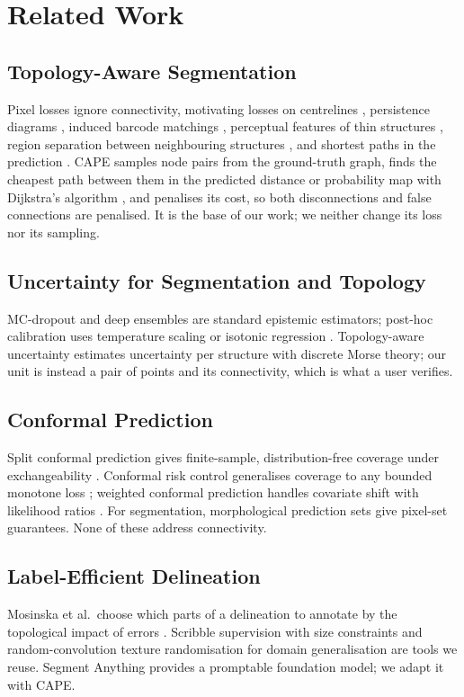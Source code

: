 \documentclass[10pt,letterpaper,journal]{IEEEtran}
\newcommand{\1}{\mathbf{1}}
\begin{document}
\section{Related Work}\label{sec:related}
\subsection{Topology-Aware Segmentation}
Pixel losses ignore connectivity, motivating losses on centrelines \cite{cldice}, persistence diagrams \cite{hu2019}, induced barcode matchings \cite{stucki2023}, perceptual features of thin structures \cite{mosinska2018}, region separation between neighbouring structures \cite{oner2022}, and shortest paths in the prediction \cite{cape}. CAPE \cite{cape} samples node pairs from the ground-truth graph, finds the cheapest path between them in the predicted distance or probability map with Dijkstra's algorithm \cite{dijkstra}, and penalises its cost, so both disconnections and false connections are penalised. It is the base of our work; we neither change its loss nor its sampling.

\subsection{Uncertainty for Segmentation and Topology}
MC-dropout \cite{gal2016} and deep ensembles \cite{lakshminarayanan2017} are standard epistemic estimators; post-hoc calibration uses temperature scaling \cite{guo2017} or isotonic regression \cite{zadrozny2002}. Topology-aware uncertainty \cite{gupta2023} estimates uncertainty per structure with discrete Morse theory; our unit is instead a pair of points and its connectivity, which is what a user verifies.

\subsection{Conformal Prediction}
Split conformal prediction gives finite-sample, distribution-free coverage under exchangeability \cite{vovk2005,angelopoulos2021}. Conformal risk control generalises coverage to any bounded monotone loss \cite{crc}; weighted conformal prediction handles covariate shift with likelihood ratios \cite{tibshirani2019}. For segmentation, morphological prediction sets \cite{mossina2025} give pixel-set guarantees. None of these address connectivity.

\subsection{Label-Efficient Delineation}
Mosinska et al.\ choose which parts of a delineation to annotate by the topological impact of errors \cite{mosinska2017}. Scribble supervision with size constraints \cite{kervadec2019} and random-convolution texture randomisation for domain generalisation \cite{randconv} are tools we reuse. Segment Anything \cite{sam} provides a promptable foundation model; we adapt it with CAPE.
\end{document}
